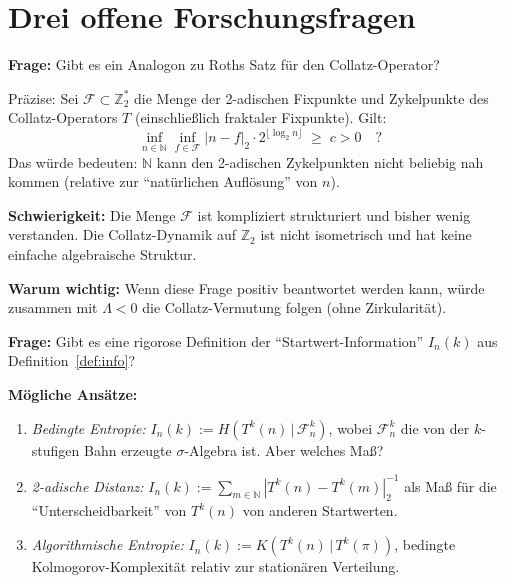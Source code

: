 \documentclass[12pt,a4paper]{article}
\newcommand{\N}{\mathbb{N}}
\newcommand{\Ztwo}{\mathbb{Z}_2}
\newcommand{\KC}{K}    %
\begin{document}
\section{Drei offene Forschungsfragen}
\label{sec:fragen}

\begin{tcolorbox}[forschung, title={Forschungsfrage 1: Roths Satz für Collatz}]
\textbf{Frage:} Gibt es ein Analogon zu Roths Satz für den Collatz-Operator?

\medskip
Präzise: Sei $\mathcal{F} \subset \Ztwo^*$ die Menge der 2-adischen Fixpunkte
und Zykelpunkte des Collatz-Operators $T$ (einschließlich fraktaler Fixpunkte).
Gilt:
\[
  \inf_{n \in \N} \inf_{f \in \mathcal{F}} |n - f|_2 \cdot 2^{\lfloor\log_2 n\rfloor}
  \;\geq\; c > 0
  \quad \text{?}
\]
Das würde bedeuten: $\N$ kann den 2-adischen Zykelpunkten nicht beliebig
nah kommen (relative zur ``natürlichen Auflösung'' von $n$).

\medskip
\textbf{Schwierigkeit:} Die Menge $\mathcal{F}$ ist kompliziert strukturiert
und bisher wenig verstanden. Die Collatz-Dynamik auf $\Ztwo$ ist nicht
isometrisch und hat keine einfache algebraische Struktur.

\medskip
\textbf{Warum wichtig:} Wenn diese Frage positiv beantwortet werden kann,
würde zusammen mit $\Lambda < 0$ die Collatz-Vermutung folgen (ohne
Zirkularität).
\end{tcolorbox}

\begin{tcolorbox}[forschung, title={Forschungsfrage 2: Rigorose Definition von $I_n(k)$}]
\textbf{Frage:} Gibt es eine rigorose Definition der ``Startwert-Information''
$I_n(k)$ aus Definition~\ref{def:info}?

\medskip
\textbf{Mögliche Ansätze:}
\begin{enumerate}[label=(\alph*), nosep]
  \item \emph{Bedingte Entropie:} $I_n(k) := H(T^k(n) \,|\, \mathcal{F}_n^k)$,
    wobei $\mathcal{F}_n^k$ die von der $k$-stufigen Bahn erzeugte $\sigma$-Algebra
    ist. Aber welches Maß?
  \item \emph{2-adische Distanz:} $I_n(k) := \sum_{m \in \N} |T^k(n) - T^k(m)|_2^{-1}$
    als Maß für die ``Unterscheidbarkeit'' von $T^k(n)$ von anderen Startwerten.
  \item \emph{Algorithmische Entropie:} $I_n(k) := \KC(T^k(n) \,|\, T^k(\pi))$,
    bedingte Kolmogorov-Komplexität relativ zur stationären Verteilung.
\end{enumerate}
\end{tcolorbox}
\end{document}
